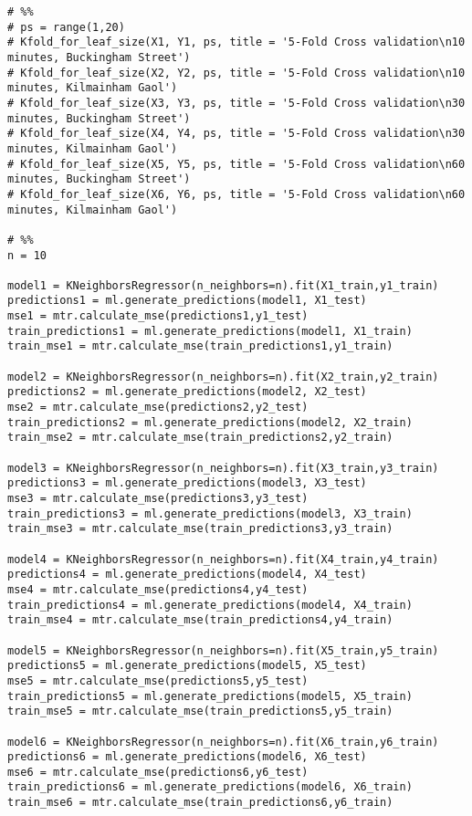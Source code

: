 \begin{verbatim}
# %%
# ps = range(1,20)
# Kfold_for_leaf_size(X1, Y1, ps, title = '5-Fold Cross validation\n10 minutes, Buckingham Street')
# Kfold_for_leaf_size(X2, Y2, ps, title = '5-Fold Cross validation\n10 minutes, Kilmainham Gaol')
# Kfold_for_leaf_size(X3, Y3, ps, title = '5-Fold Cross validation\n30 minutes, Buckingham Street')
# Kfold_for_leaf_size(X4, Y4, ps, title = '5-Fold Cross validation\n30 minutes, Kilmainham Gaol')
# Kfold_for_leaf_size(X5, Y5, ps, title = '5-Fold Cross validation\n60 minutes, Buckingham Street')
# Kfold_for_leaf_size(X6, Y6, ps, title = '5-Fold Cross validation\n60 minutes, Kilmainham Gaol')

# %%
n = 10

model1 = KNeighborsRegressor(n_neighbors=n).fit(X1_train,y1_train)
predictions1 = ml.generate_predictions(model1, X1_test)
mse1 = mtr.calculate_mse(predictions1,y1_test)
train_predictions1 = ml.generate_predictions(model1, X1_train)
train_mse1 = mtr.calculate_mse(train_predictions1,y1_train)

model2 = KNeighborsRegressor(n_neighbors=n).fit(X2_train,y2_train)
predictions2 = ml.generate_predictions(model2, X2_test)
mse2 = mtr.calculate_mse(predictions2,y2_test)
train_predictions2 = ml.generate_predictions(model2, X2_train)
train_mse2 = mtr.calculate_mse(train_predictions2,y2_train)

model3 = KNeighborsRegressor(n_neighbors=n).fit(X3_train,y3_train)
predictions3 = ml.generate_predictions(model3, X3_test)
mse3 = mtr.calculate_mse(predictions3,y3_test)
train_predictions3 = ml.generate_predictions(model3, X3_train)
train_mse3 = mtr.calculate_mse(train_predictions3,y3_train)

model4 = KNeighborsRegressor(n_neighbors=n).fit(X4_train,y4_train)
predictions4 = ml.generate_predictions(model4, X4_test)
mse4 = mtr.calculate_mse(predictions4,y4_test)
train_predictions4 = ml.generate_predictions(model4, X4_train)
train_mse4 = mtr.calculate_mse(train_predictions4,y4_train)

model5 = KNeighborsRegressor(n_neighbors=n).fit(X5_train,y5_train)
predictions5 = ml.generate_predictions(model5, X5_test)
mse5 = mtr.calculate_mse(predictions5,y5_test)
train_predictions5 = ml.generate_predictions(model5, X5_train)
train_mse5 = mtr.calculate_mse(train_predictions5,y5_train)

model6 = KNeighborsRegressor(n_neighbors=n).fit(X6_train,y6_train)
predictions6 = ml.generate_predictions(model6, X6_test)
mse6 = mtr.calculate_mse(predictions6,y6_test)
train_predictions6 = ml.generate_predictions(model6, X6_train)
train_mse6 = mtr.calculate_mse(train_predictions6,y6_train)


\end{verbatim}
